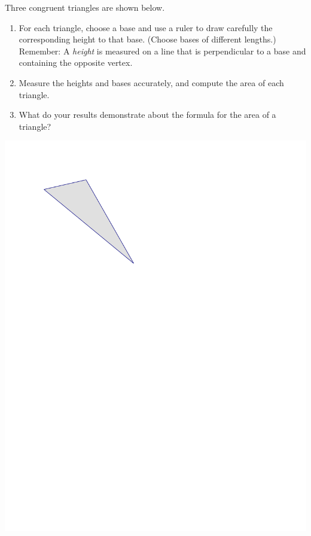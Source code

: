 \documentclass{ximera}
\begin{document}
\begin{problem}
Three congruent triangles are shown below.   
\begin{enumerate}
\item For each triangle, choose a base and use a ruler to draw carefully the corresponding height to that base.  (Choose bases of different lengths.)  Remember:  A \emph{height} is measured on a line that is perpendicular to a base and containing the opposite vertex. 
\item Measure the heights and bases accurately, and compute the area of each triangle.  
\item What do your results demonstrate about the formula for the area of a triangle?  
\end{enumerate}

\begin{image}
\includegraphics{./graphics/triangle.pdf}
\end{image}
\begin{image}

\end{image}
\end{problem}
\end{document}
